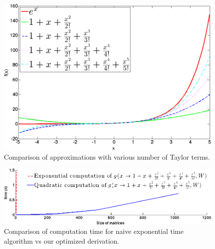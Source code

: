 \begin{figure}[h]
\centering
\includegraphics[scale=0.2]{img/approximations.png}
\caption{Comparison of approximations with various number of Taylor terms.}
\label{approximations}
\end{figure}



\begin{figure}[h]
\centering
\includegraphics[scale=0.24]{img/time_approx.png}
\caption{Comparison of computation time for naive exponential time algorithm vs our optimized derivation.}
\label{time_approx}
\end{figure}


